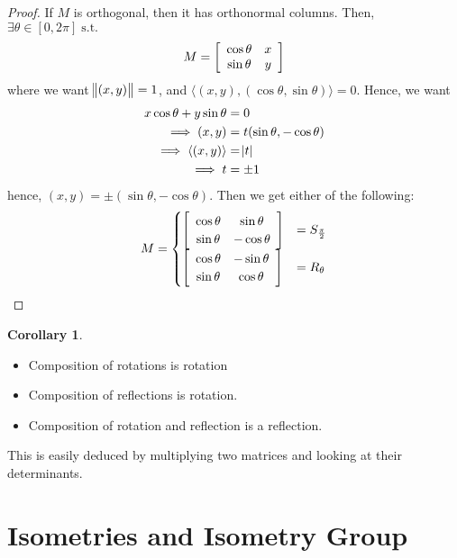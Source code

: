 \documentclass[11pt]{amsart} %
\theoremstyle{definition}
\newtheorem{corollary}[definition]{Corollary}
\theoremstyle{definition}
\DeclareMathOperator{\suchthat}{\text{ s.t. }}
\numberwithin{equation}{section}
\begin{document}
\begin{proof}
	If $M $ is orthogonal, then it has orthonormal columns. Then, $\exists \theta \in [0,2\pi] \suchthat $
	$$ M = \left[\begin{array}{c c} \cos \theta & x \\ \sin \theta & y \end{array} \right]$$
	where we want $\norm{ (x,y) } =1$, and $\langle (x,y), (\cos \theta, \sin \theta) \rangle = 0$. Hence, we want
	\begin{align*}
	x \cos \theta + y \sin \theta &= 0 \\
	\implies (x,y ) & = t (\sin \theta, - \cos \theta ) \\
	\implies \langle (x,y) \rangle &= \abs{t} \\
	\implies t &= \pm 1
	\end{align*}
	hence, $(x,y) = \pm (\sin \theta, -\cos \theta)$. Then we get either of the following:
	$$ M = 
	\begin{cases}
	\left[\begin{array}{c c} \cos \theta & \sin \theta \\ \sin \theta & -\cos \theta \end{array}\right] & = S_{\frac{\pi}{2}} \\
 	\left[\begin{array}{c c} \cos \theta & -\sin \theta \\ \sin \theta & \cos \theta \end{array}\right]  &  = R_{\theta}
	\end{cases}
	 $$
\end{proof}

\begin{corollary}
	\begin{itemize}%
		\item Composition of rotations is rotation
		\item Composition of reflections is rotation.
		\item Composition of rotation and reflection is a reflection.
	\end{itemize}

	This is easily deduced by multiplying two matrices and looking at their determinants.
\end{corollary}

\clearpage

\section{Isometries and Isometry Group}
\end{document}

